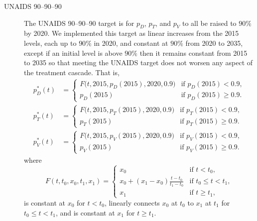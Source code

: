 \documentclass{article}
\begin{document}
\begin{description}
\item[UNAIDS 90--90--90] The UNAIDS 90--90--90 target is for $p_D$,
  $p_T$, and $p_V$ to all be raised to $90\%$ by 2020.  We implemented
  this target as linear increases from the 2015 levels, each up to
  $90\%$ in 2020, and constant at $90\%$ from 2020 to 2035, except if
  an initial level is above $90\%$ then it remains constant from 2015
  to 2035 so that meeting the UNAIDS target does not worsen any aspect
  of the treatment cascade.  That is,
  \begin{equation}
    \label{unaids90_targets}
    \begin{split}
      p_D^*(t) &=
      \begin{cases}
        F\big(t, 2015, p_D(2015), 2020, 0.9\big)
        & \text{if $p_D(2015) < 0.9$},
        \\
        p_D(2015) & \text{if $p_D(2015) \geq 0.9$}.
      \end{cases}
      \\
      p_T^*(t) &=
      \begin{cases}
        F\big(t, 2015, p_T(2015), 2020, 0.9\big)
        & \text{if $p_T(2015) < 0.9$},
        \\
        p_T(2015) & \text{if $p_T(2015) \geq 0.9$}.
      \end{cases}
      \\
      p_V^*(t) &=
      \begin{cases}
        F\big(t, 2015, p_V(2015), 2020, 0.9\big)
        & \text{if $p_V(2015) < 0.9$},
        \\
        p_V(2015) & \text{if $p_V(2015) \geq 0.9$}.
      \end{cases}
    \end{split}
  \end{equation}
  where
  \begin{equation}
    \label{F}
    F(t, t_0, x_0, t_1, x_1) =
    \begin{cases}
      x_0 & \text{if $t < t_0$},
      \\
      x_0 + (x_1 - x_0) \frac{t - t_0}{t_1 - t_0} &
      \text{if $t_0 \leq t < t_1$},
      \\
      x_1 & \text{if $t \geq t_1$},
    \end{cases}
  \end{equation}
  is constant at $x_0$ for $t < t_0$, linearly connects $x_0$ at
  $t_0$ to $x_1$ at $t_1$ for $t_0 \leq t < t_1$, and is constant at
  $x_1$ for $t \geq t_1$.


\end{description}
\end{document}
